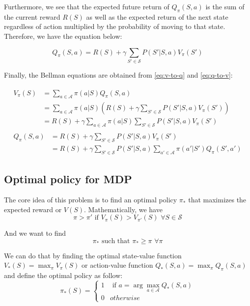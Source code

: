\documentclass[
  a4paper, xcolor = usenames,dvipsnames]{article}
\theoremstyle{definition}
\theoremstyle{definition}
\theoremstyle{definition}
\theoremstyle{definition}
\theoremstyle{remark}
\begin{document}
Furthermore, we see that the expected future return of \(Q_{\pi}(S, a)\) is the sum of the current reward \(R(S)\) as well as the expected return of the next state regardless of action multiplied by the probability of moving to that state. Therefore, we have the equation below:

\begin{equation}
Q_{\pi}(S, a) = R(S) + \gamma \sum_{S' \in \mathcal{S}} P(S' | S, a) V_{\pi}(S')
\label{eq:q-to-v}
\end{equation}

Finally, the Bellman equations are obtained from \eqref{eq:v-to-q} and \eqref{eq:q-to-v}:

\begin{align}
\begin{split}
V_{\pi}(S) {}&= \sum_{a \in \mathcal{A}} \pi(a | S) Q_{\pi}(S, a) \\
  &= \sum_{a \in \mathcal{A}} \pi(a | S) (R(S) + \gamma \sum_{S' \in \mathcal{S}} P(S' | S, a) V_{\pi}(S')) \\
  &= R(S) + \gamma \sum_{a \in \mathcal{A}} \pi(a | S) \sum_{S' \in \mathcal{S}} P(S' | S, a) V_{\pi}(S')
\label{eq:bellman-v-1}
\end{split} \\
\begin{split}
Q_{\pi}(S, a) {}&= R(S) + \gamma \sum_{S' \in \mathcal{S}} P(S' | S, a) V_{\pi}(S') \\
  &= R(S) + \gamma \sum_{S' \in \mathcal{S}} P(S' | S, a) \sum_{a' \in \mathcal{A}} \pi(a' | S') Q_{\pi}(S', a')
\label{eq:bellman-q-1}
\end{split}
\end{align}

\hypertarget{optimal-policy-for-mdp}{%
\subsection{Optimal policy for MDP}\label{optimal-policy-for-mdp}}

The core idea of this problem is to find an optimal policy \(\pi_{*}\) that maximizes the expected reward or \(V(S)\). Mathematically, we have
\[
\pi > \pi' \text{ if } V_{\pi}(S) > V_{\pi'}(S) \,\, \forall S \in \mathcal{S}
\]

And we want to find
\[
\pi_{*} \text{ such that } \pi_{*} \ge \pi \,\, \forall \pi
\]

We can do that by finding the optimal state-value function \(V_{*}(S) = \max_{\pi} V_{\pi}(S)\) or action-value function \(Q_{*}(S, a) = \max_{\pi} Q_{\pi}(S, a)\) and define the optimal policy as follow:
\[
\pi_{*}(S) = \begin{cases}
1 & \text{ if } a = \arg\max_{a \in \mathcal{A}} Q_{*}(S, a) \\
0 & otherwise
\end{cases}
\]
\end{document}
